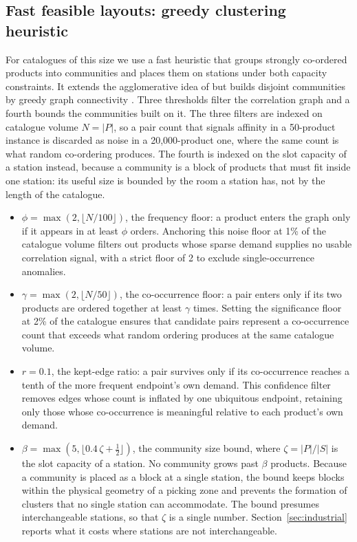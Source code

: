 \documentclass[]{interact}
\begin{document}
\subsection{Fast feasible layouts: greedy clustering heuristic}\label{sec:heuristic}
For catalogues of this size we use a fast heuristic that groups strongly co-ordered products into communities and places them on stations under both capacity constraints. It extends the agglomerative idea of \citet{chuang2016} but builds disjoint communities by greedy graph connectivity \citep{west2001introduction}. Three thresholds filter the correlation graph and a fourth bounds the communities built on it. The three filters are indexed on catalogue volume $N=|P|$, so a pair count that signals affinity in a 50-product instance is discarded as noise in a 20,000-product one, where the same count is what random co-ordering produces. The fourth is indexed on the slot capacity of a station instead, because a community is a block of products that must fit inside one station: its useful size is bounded by the room a station has, not by the length of the catalogue.
\begin{itemize}
\item $\phi=\max(2,\lfloor N/100\rfloor)$, the frequency floor: a product enters the graph only if it appears in at least $\phi$ orders. Anchoring this noise floor at 1\% of the catalogue volume filters out products whose sparse demand supplies no usable correlation signal, with a strict floor of 2 to exclude single-occurrence anomalies.
\item $\gamma=\max(2,\lfloor N/50\rfloor)$, the co-occurrence floor: a pair enters only if its two products are ordered together at least $\gamma$ times. Setting the significance floor at 2\% of the catalogue ensures that candidate pairs represent a co-occurrence count that exceeds what random ordering produces at the same catalogue volume.
\item $r=0.1$, the kept-edge ratio: a pair survives only if its co-occurrence reaches a tenth of the more frequent endpoint's own demand. This confidence filter removes edges whose count is inflated by one ubiquitous endpoint, retaining only those whose co-occurrence is meaningful relative to each product's own demand.
\item $\beta=\max\!\left(5,\big\lfloor 0.4\,\zeta+\tfrac12 \big\rfloor\right)$, the community size bound, where $\zeta=|P|/|S|$ is the slot capacity of a station. No community grows past $\beta$ products. Because a community is placed as a block at a single station, the bound keeps blocks within the physical geometry of a picking zone and prevents the formation of clusters that no single station can accommodate. The bound presumes interchangeable stations, so that $\zeta$ is a single number. Section~\ref{sec:industrial} reports what it costs where stations are not interchangeable.
\end{itemize}
\end{document}
